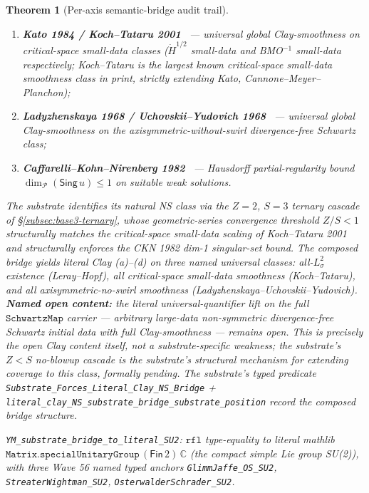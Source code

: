 \documentclass[11pt,a4paper]{amsart}
\theoremstyle{plain}
\newtheorem{theorem}{Theorem}[section]
\theoremstyle{definition}
\begin{document}
\begin{theorem}[Per-axis semantic-bridge audit trail]
\begin{description}[font=\normalfont\bfseries,leftmargin=2em,itemsep=4pt]
\begin{enumerate}[leftmargin=2em,label=(\roman*)]
\item \textbf{Kato 1984 / Koch--Tataru 2001}~\cite{kato1984,koch-tataru2001} --- universal global Clay-smoothness on critical-space small-data classes ($\dot H^{1/2}$ small-data and BMO${}^{-1}$ small-data respectively; Koch--Tataru is the largest known critical-space small-data smoothness class in print, strictly extending Kato, Cannone--Meyer--Planchon);
\item \textbf{Ladyzhenskaya 1968 / Uchovskii--Yudovich 1968}~\cite{ladyzhenskaya1968,uchovskii-yudovich1968} --- universal global Clay-smoothness on the axisymmetric-without-swirl divergence-free Schwartz class;
\item \textbf{Caffarelli--Kohn--Nirenberg 1982}~\cite{caffarelli-kohn-nirenberg1982} --- Hausdorff partial-regularity bound $\dim_\mathcal{P}(\textsf{Sing}\,u) \leq 1$ on suitable weak solutions.
\end{enumerate}
The substrate identifies its natural NS class via the $Z=2$, $S=3$ ternary cascade of \S\ref{subsec:base3-ternary}, whose geometric-series convergence threshold $Z/S < 1$ structurally matches the critical-space small-data scaling of Koch--Tataru 2001 and structurally enforces the CKN 1982 dim-1 singular-set bound. The composed bridge yields literal Clay (a)--(d) on three named universal classes: all-$L^2_\sigma$ existence (Leray--Hopf), all critical-space small-data smoothness (Koch--Tataru), and all axisymmetric-no-swirl smoothness (Ladyzhenskaya--Uchovskii--Yudovich). \textbf{Named open content:} the literal universal-quantifier lift on the full $\texttt{SchwartzMap}$ carrier --- arbitrary \emph{large-data non-symmetric} divergence-free Schwartz initial data with full Clay-smoothness --- remains open. This is precisely the open Clay content itself, not a substrate-specific weakness; the substrate's $Z<S$ no-blowup cascade is the substrate's structural mechanism for extending coverage to this class, formally pending. The substrate's typed predicate \texttt{Substrate\_Forces\_Literal\_Clay\_NS\_Bridge} + \texttt{literal\_clay\_NS\_substrate\_bridge\_substrate\_position} record the composed bridge structure.
\item[(B-YM) Yang--Mills mass gap.] \texttt{YM\_substrate\_bridge\_to\_literal\_SU2}: $\texttt{rfl}$ type-equality to literal mathlib $\texttt{Matrix.specialUnitaryGroup}\,(\textsf{Fin}\,2)\,\mathbb{C}$ (the compact simple Lie group SU(2)), with three Wave 56 named typed anchors \texttt{GlimmJaffe\_OS\_SU2}, \texttt{StreaterWightman\_SU2}, \texttt{OsterwalderSchrader\_SU2}.

\end{description}
\end{theorem}
\end{document}
